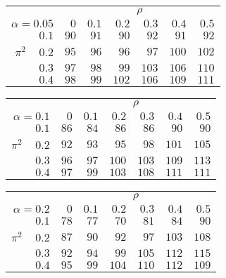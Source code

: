 \begin{tabular}{r|rrrrrr}
\hline\hline
 &\multicolumn{6}{c}{$\rho$} \\ 
 $\alpha = 0.05$ & $0$ & $0.1$ & $0.2$ & $0.3$ & $0.4$ & $0.5$ \\ 
 \hline$0.1$ & $ 90$ & $ 91$ & $ 90$ & $ 92$ & $ 91$ & $ 92$\\ 
$\pi^2\;\;\;$ $0.2$ & $ 95$ & $ 96$ & $ 96$ & $ 97$ & $100$ & $102$\\ 
$0.3$ & $ 97$ & $ 98$ & $ 99$ & $103$ & $106$ & $110$\\ 
$0.4$ & $ 98$ & $ 99$ & $102$ & $106$ & $109$ & $111$\\ 
 \hline 
 \end{tabular}
 
 \vspace{2em} 
 
\begin{tabular}{r|rrrrrr}
\hline\hline
 &\multicolumn{6}{c}{$\rho$} \\ 
 $\alpha = 0.1$ & $0$ & $0.1$ & $0.2$ & $0.3$ & $0.4$ & $0.5$ \\ 
 \hline$0.1$ & $ 86$ & $ 84$ & $ 86$ & $ 86$ & $ 90$ & $ 90$\\ 
$\pi^2\;\;\;$ $0.2$ & $ 92$ & $ 93$ & $ 95$ & $ 98$ & $101$ & $105$\\ 
$0.3$ & $ 96$ & $ 97$ & $100$ & $103$ & $109$ & $113$\\ 
$0.4$ & $ 97$ & $ 99$ & $103$ & $108$ & $111$ & $111$\\ 
 \hline 
 \end{tabular}
 
 \vspace{2em} 
 
\begin{tabular}{r|rrrrrr}
\hline\hline
 &\multicolumn{6}{c}{$\rho$} \\ 
 $\alpha = 0.2$ & $0$ & $0.1$ & $0.2$ & $0.3$ & $0.4$ & $0.5$ \\ 
 \hline$0.1$ & $ 78$ & $ 77$ & $ 70$ & $ 81$ & $ 84$ & $ 90$\\ 
$\pi^2\;\;\;$ $0.2$ & $ 87$ & $ 90$ & $ 92$ & $ 97$ & $103$ & $108$\\ 
$0.3$ & $ 92$ & $ 94$ & $ 99$ & $105$ & $112$ & $115$\\ 
$0.4$ & $ 95$ & $ 99$ & $104$ & $110$ & $112$ & $109$\\ 
 \hline 
 \end{tabular}